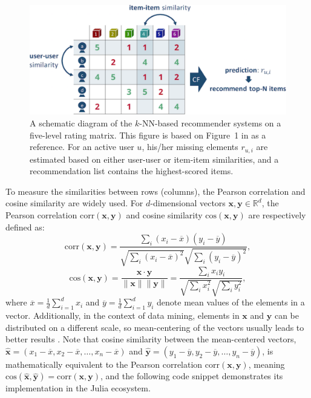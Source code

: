 \begin{figure}[htbp]
  \centering
  \includegraphics[width=1.0\linewidth]{images/cf.pdf}
  \caption{A schematic diagram of the $k$-NN-based recommender systems on a five-level rating matrix. This figure is based on Figure~1 in \cite{Sarwar2001} as a reference. For an active user $u$, his/her missing elements $r_{u,i}$ are estimated based on either user-user or item-item similarities, and a recommendation list contains the highest-scored items.}
  \label{fig:cf}
\end{figure}

To measure the similarities between rows (columns), the Pearson correlation and cosine similarity are widely used. For $d$-dimensional vectors $\mathbf{x}, \mathbf{y} \in \mathbb{R}^d$, the Pearson correlation $\mathrm{corr}(\mathbf{x}, \mathbf{y})$ and cosine similarity $\mathrm{cos}(\mathbf{x}, \mathbf{y})$ are respectively defined as:
$$
\mathrm{corr}(\mathbf{x}, \mathbf{y}) = \frac{\sum_i (x_{i} - \overline{x})(y_{i} - \overline{y})}{\sqrt{\sum_i (x_{i} - \overline{x})^2} \sqrt{\sum_i (y_{i} - \overline{y})^2}},
$$
$$
\mathrm{cos}(\mathbf{x}, \mathbf{y}) = \frac{\mathbf{x} \cdot \mathbf{y}}{\| \mathbf{x} \| \| \mathbf{y} \|} = \frac{\sum_i x_{i} y_{i}}{\sqrt{\sum_i x_{i}^2} \sqrt{\sum_i y_{i}^2}},
$$
where $\overline{x} = \frac{1}{d} \sum^d_{i=1} x_i$ and $\overline{y} = \frac{1}{d} \sum^d_{i=1} y_i$ denote mean values of the elements in a vector. Additionally, in the context of data mining, elements in $\mathbf{x}$ and $\mathbf{y}$ can be distributed on a different scale, so mean-centering of the vectors usually leads to better results \cite{Sarwar2001}. Note that cosine similarity between the mean-centered vectors, $\hat{\mathbf{x}} = (x_1 - \overline{x}, x_2 - \overline{x}, \dots, x_n - \overline{x})$ and $\hat{\mathbf{y}} = (y_1 - \overline{y}, y_2 - \overline{y}, \dots, y_n - \overline{y})$, is mathematically equivalent to the Pearson correlation $\mathrm{corr}(\mathbf{x}, \mathbf{y})$, meaning $\mathrm{cos}(\hat{\mathbf{x}}, \hat{\mathbf{y}}) = \mathrm{corr}(\mathbf{x}, \mathbf{y})$, and the following code snippet demonstrates its implementation in the Julia ecosystem.

